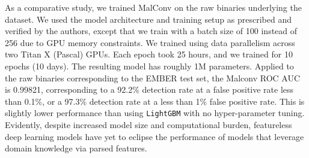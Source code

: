 As a comparative study, we trained MalConv \cite{raff2017malware} on the raw binaries underlying the dataset.  We used the model architecture and training setup as prescribed and verified by the authors, except that we train with a batch size of 100 instead of 256 due to GPU memory constraints.  We trained using data parallelism across two Titan X (Pascal) GPUs.  Each epoch took 25 hours, and we trained for 10 epochs (10 days).  The resulting model has roughly 1M parameters.  Applied to the raw binaries corresponding to the EMBER test set, the Malconv ROC AUC is 0.99821, corresponding to a 92.2\% detection rate at a false positive rate less than 0.1\%, or a 97.3\% detection rate at a less than 1\% false positive rate.  This is slightly lower performance than using \texttt{LightGBM} with no hyper-parameter tuning.  Evidently, despite increased model size and computational burden, featureless deep learning models have yet to eclipse the performance of models that leverage domain knowledge via parsed features.
